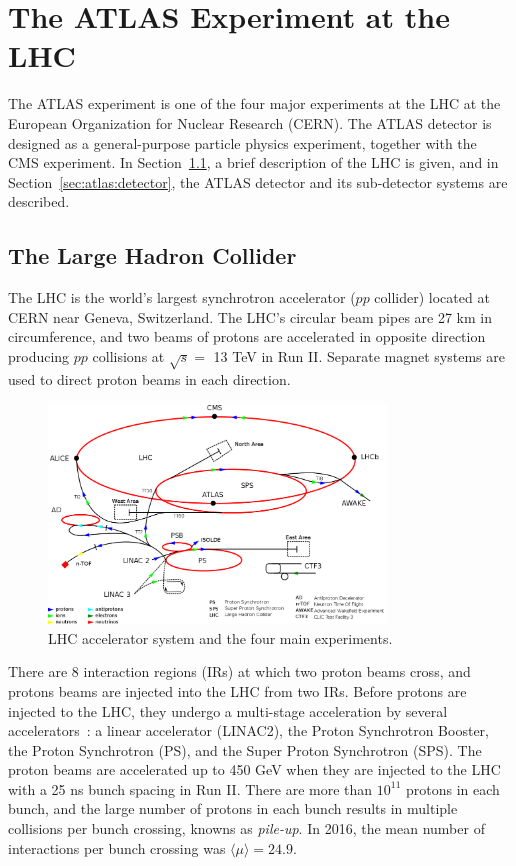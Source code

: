 \chapter{The ATLAS Experiment at the LHC}
\label{chap:atlas_experiment}
The ATLAS experiment is one of the four major experiments at the LHC at the European Organization for Nuclear Research (CERN). The ATLAS detector is designed as a general-purpose particle physics experiment, together with the CMS experiment. In Section~\ref{sec:atlas:lhc}, a brief description of the LHC is given, and in Section~\ref{sec:atlas:detector}, the ATLAS detector and its sub-detector systems are described.

\section{The Large Hadron Collider}
\label{sec:atlas:lhc}

The LHC is the world's largest synchrotron accelerator ($pp$ collider) located at CERN near Geneva, Switzerland. The LHC's circular beam pipes are 27 km in circumference, and two beams of protons are accelerated in opposite direction producing $pp$ collisions at $\sqrt{s} = $ 13 TeV in Run II. Separate magnet systems are used to direct proton beams in each direction.

\begin{figure}[!htb]
    \includegraphics[width=0.8\textwidth]{figures/lhc.png}
    \centering
    \caption{LHC accelerator system and the four main experiments.}
    \label{fig:lhc}
\end{figure}

There are 8 interaction regions (IRs) at which two proton beams cross, and protons beams are injected into the LHC from two IRs. Before protons are injected to the LHC, they undergo a multi-stage acceleration by several accelerators~\cite{Bruning:782076}: a linear accelerator (LINAC2), the Proton Synchrotron Booster, the Proton Synchrotron (PS), and the Super Proton Synchrotron (SPS). The proton beams are accelerated up to 450 GeV when they are injected to the LHC with a 25 ns bunch spacing in Run II. There are more than $10^{11}$ protons in each bunch, and the large number of protons in each bunch results in multiple collisions per bunch crossing, knowns as \textit{pile-up}. In 2016, the mean number of interactions per bunch crossing was $\langle\mu\rangle = 24.9$.

